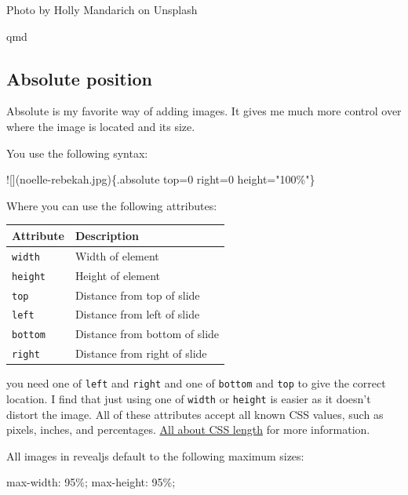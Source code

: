 \documentclass[
  letterpaper,
  DIV=11,
  numbers=noendperiod]{scrreprt}
\newenvironment{Shaded}{\begin{snugshade}}{\end{snugshade}}
\newcommand{\AlertTok}[1]{\textcolor[rgb]{0.68,0.00,0.00}{#1}}
\newcommand{\InformationTok}[1]{\textcolor[rgb]{0.37,0.37,0.37}{#1}}
\newcommand{\NormalTok}[1]{\textcolor[rgb]{0.00,0.23,0.31}{#1}}
\begin{document}
Photo by Holly Mandarich on Unsplash

qmd

\subsection{Absolute position}\label{absolute-position}

Absolute is my favorite way of adding images. It gives me much more
control over where the image is located and its size.

You use the following syntax:

\begin{Shaded}
\begin{Highlighting}[]
\AlertTok{![](noelle{-}rebekah.jpg)}\NormalTok{\{.absolute top=0 right=0 height="100\%"\}}
\end{Highlighting}
\end{Shaded}

Where you can use the following attributes:

\begin{longtable}[]{@{}ll@{}}
\toprule\noalign{}
Attribute & Description \\
\midrule\noalign{}
\endhead
\bottomrule\noalign{}
\endlastfoot
\texttt{width} & Width of element \\
\texttt{height} & Height of element \\
\texttt{top} & Distance from top of slide \\
\texttt{left} & Distance from left of slide \\
\texttt{bottom} & Distance from bottom of slide \\
\texttt{right} & Distance from right of slide \\
\end{longtable}

you need one of \texttt{left} and \texttt{right} and one of
\texttt{bottom} and \texttt{top} to give the correct location. I find
that just using one of \texttt{width} or \texttt{height} is easier as it
doesn't distort the image. All of these attributes accept all known CSS
values, such as pixels, inches, and percentages.
\href{https://developer.mozilla.org/en-US/docs/Web/CSS/length}{All about
CSS length} for more information.

All images in revealjs default to the following maximum sizes:

\begin{Shaded}
\begin{Highlighting}[]
\NormalTok{max{-}width}\InformationTok{:}\NormalTok{ 95\%;}
\NormalTok{max{-}height}\InformationTok{:}\NormalTok{ 95\%;}
\end{Highlighting}
\end{Shaded}
\end{document}
